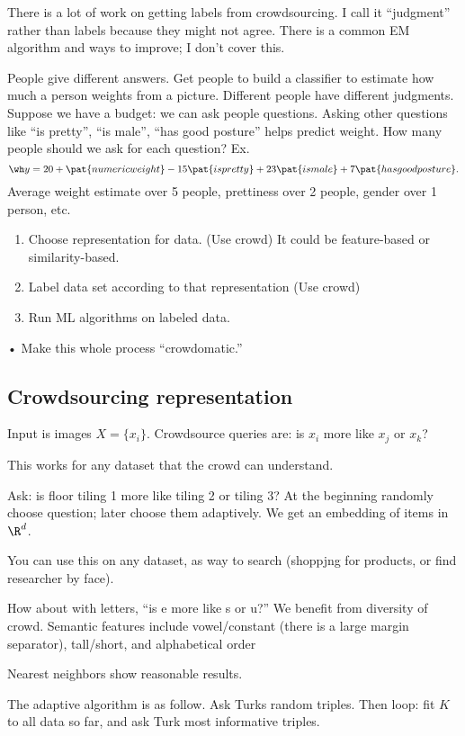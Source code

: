 There is a lot of work on getting labels from crowdsourcing. I call it ``judgment'' rather than labels because they might not agree. There is a common EM algorithm and ways to improve; I don't cover this.

People give different answers. Get people to build a classifier to estimate how much a person weights from a picture.
Different people have different judgments.
Suppose we have a budget: we can ask people questions. Asking other questions like ``is pretty'', ``is male'', ``has good posture'' helps predict weight. How many people should we ask for each question?
Ex.
$$
\wh y = 20+\pat{numeric weight} - 15\pat{is pretty} + 23\pat{is male} + 7\pat{has good posture}.
$$
Average weight estimate over 5 people, prettiness over 2 people, gender over 1 person, etc.
\begin{enumerate}
\item
Choose representation for data. (Use crowd)
It could be feature-based or similarity-based.
\item
Label data set according to that representation (Use crowd)
\item 
Run ML algorithms on labeled data.
\end{enumerate}•
Make this whole process ``crowdomatic.''


\subsection{Crowdsourcing representation}

Input is images $X=\{x_i\}$. Crowdsource queries are: is $x_i$ more like $x_j$ or $x_k$?

This works for any dataset that the crowd can understand.

Ask: is floor tiling 1 more like tiling 2 or tiling 3?
At the beginning randomly choose question; later choose them adaptively.
We get an embedding of items in $\R^d$.

You can use this on any dataset, as way to search (shoppjng for products, or find researcher by face).

How about with letters, ``is e more like s or u?'' We benefit from diversity of crowd. Semantic features include vowel/constant (there is a large margin separator), tall/short, and alphabetical order

Nearest neighbors show reasonable results.

The adaptive algorithm is as follow. Ask Turks random triples. Then loop: fit $K$ to all data so far, and ask Turk most informative triples.

